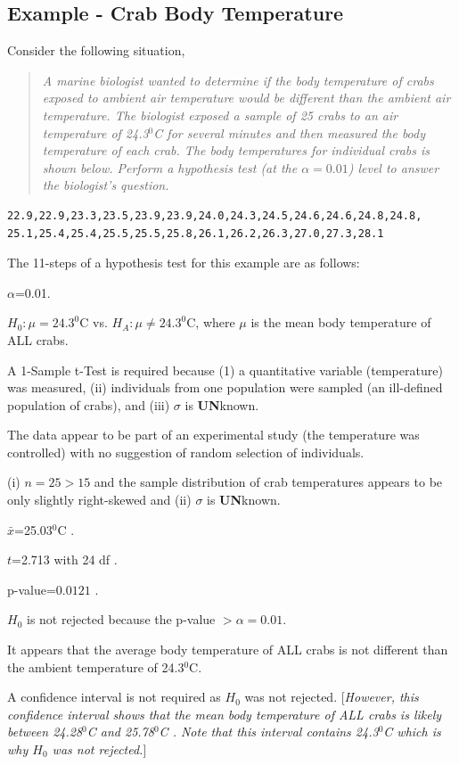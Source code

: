 \documentclass[10pt,openany]{book}\usepackage[]{graphicx}\usepackage[]{color}
\begin{document}
\subsection{Example - Crab Body Temperature}
\vspace{-12pt}
Consider the following situation,
\begin{quote}
\textsl{A marine biologist wanted to determine if the body temperature of crabs exposed to ambient air temperature would be different than the ambient air temperature.  The biologist exposed a sample of 25 crabs to an air temperature of 24.3$^{0}$C for several minutes and then measured the body temperature of each crab.  The body temperatures for individual crabs is shown below.  Perform a hypothesis test (at the $\alpha=0.01$) level to answer the biologist's question.}
\end{quote}

\begin{Verbatim}[xleftmargin=15mm]
22.9,22.9,23.3,23.5,23.9,23.9,24.0,24.3,24.5,24.6,24.6,24.8,24.8,
25.1,25.4,25.4,25.5,25.5,25.8,26.1,26.2,26.3,27.0,27.3,28.1
\end{Verbatim}




The 11-steps  of a hypothesis test for this example are as follows:
\begin{Enumerate}
    \item $\alpha$=0.01.
    \item $H_{0}:\mu=24.3^{0}$C vs. $H_{A}:\mu\neq24.3^{0}$C, where $\mu$ is the mean body temperature of ALL crabs.
    \item A 1-Sample t-Test is required because (1) a quantitative variable (temperature) was measured, (ii) individuals from one population were sampled (an ill-defined population of crabs), and (iii) $\sigma$ is \textbf{UN}known.
    \item The data appear to be part of an experimental study (the temperature was controlled) with no suggestion of random selection of individuals.
    \item (i) $n=25>15$ and the sample distribution of crab temperatures appears to be only slightly right-skewed  and (ii) $\sigma$ is \textbf{UN}known.
    \item $\bar{x}$=25.03$^{0}$C .
    \item $t$=2.713 with 24 df .
    \item p-value=$0.0121$ .
    \item $H_{0}$ is not rejected because the p-value $>\alpha=0.01$.
    \item It appears that the average body temperature of ALL crabs is not different than the ambient temperature of 24.3$^{0}$C.
    \item A confidence interval is not required as $H_{0}$ was not rejected.  [\textit{However, this confidence interval shows that the mean body temperature of ALL crabs is likely between 24.28$^{0}$C and 25.78$^{0}$C .  Note that this interval contains 24.3$^{0}$C which is why $H_{0}$ was not rejected.}]
\end{Enumerate}
\end{document}
